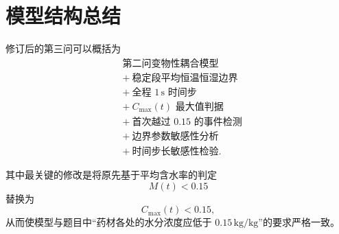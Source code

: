 \documentclass[UTF8,a4paper,12pt]{ctexart}
\begin{document}
\section{模型结构总结}

修订后的第三问可以概括为
\[
\boxed{
\begin{aligned}
&\text{第二问变物性耦合模型}\\
&+\ \text{稳定段平均恒温恒湿边界}\\
&+\ \text{全程 }1\,\mathrm{s}\text{ 时间步}\\
&+\ C_{\max}(t)\text{ 最大值判据}\\
&+\ \text{首次越过 }0.15\text{ 的事件检测}\\
&+\ \text{边界参数敏感性分析}\\
&+\ \text{时间步长敏感性检验}.
\end{aligned}}
\]

其中最关键的修改是将原先基于平均含水率的判定
\[
M(t)<0.15
\]
替换为
\[
C_{\max}(t)<0.15,
\]
从而使模型与题目中“药材各处的水分浓度应低于 $0.15\,\mathrm{kg/kg}$”的要求严格一致。

\end{document}

